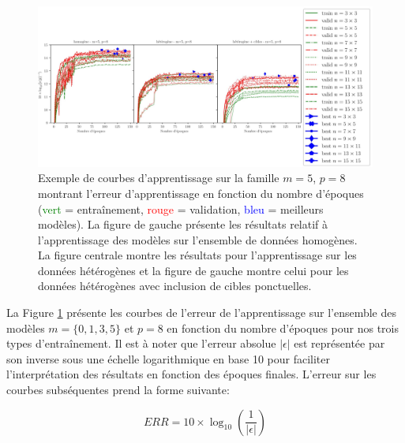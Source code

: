 \begin{figure}[!htbp] 
\includegraphics[width=1.20\textwidth, angle=270,origin=c]{figures/Chap4/results/training_types_compare/training_curves_m=5_p=8_n=all.jpg}
 \centering
  \caption{
  \small{Exemple de courbes d'apprentissage sur la famille $m=5$, $p=8$ montrant l'erreur d'apprentissage en fonction du nombre d'époques (\textcolor{green}{vert} = entraînement, \textcolor{red}{rouge}  = validation, \textcolor{blue}{bleu}  = meilleurs modèles). La figure de gauche présente les résultats relatif à l'apprentissage des modèles sur l'ensemble de données homogènes.  La figure centrale montre les résultats pour l'apprentissage sur les données hétérogènes et la figure de gauche montre celui pour les données hétérogènes avec inclusion de cibles ponctuelles.}
  }
  \label{fig:training_curves_m=5_p=8_n=all}
\end{figure}

La Figure \ref{fig:training_curves_m=5_p=8_n=all} présente les courbes de l'erreur de l'apprentissage sur l'ensemble des modèles $m=\{0,1,3,5\}$ et $p=8$ en fonction du nombre d'époques pour nos trois types d'entraînement. Il est à noter que l'erreur absolue $|\epsilon|$ est représentée par son inverse sous une échelle logarithmique en base 10 pour faciliter l'interprétation des résultats en fonction des époques finales. L'erreur sur les courbes subséquentes prend la forme suivante:

\begin{equation}
    ERR = 10 \times \log_{10}\left(\frac{1}{|\epsilon|}\right)
\end{equation}

\vspace{5pt}

